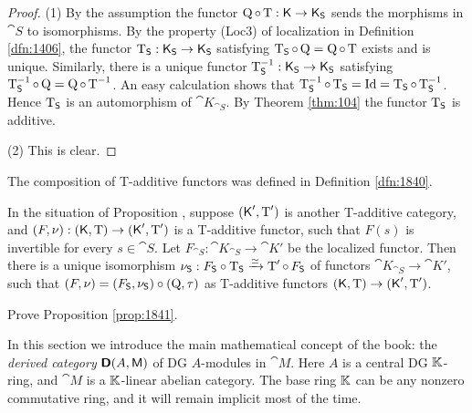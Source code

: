 \begin{proof} \mbox{}

\smallskip \noindent
(1) By the assumption the functor 
$\operatorname{Q} \circ \operatorname{T} : \operatorname{\mathsf{K}} \to  \operatorname{\mathsf{K}}_{\operatorname{\mathsf{S}}}$
sends the morphisms in $\cat{S}$ to isomorphisms. By the property (Loc3) of 
localization in Definition \ref{dfn:1406}, the functor 
$\operatorname{T}_{\operatorname{\mathsf{S}}} : \operatorname{\mathsf{K}}_{\operatorname{\mathsf{S}}} \to  \operatorname{\mathsf{K}}_{\operatorname{\mathsf{S}}}$ 
satisfying
$\operatorname{T}_{\operatorname{\mathsf{S}}} \circ \operatorname{Q} = \operatorname{Q} \circ \operatorname{T}$
exists and is unique. 
Similarly, there is a unique functor 
$\operatorname{T}^{-1}_{\operatorname{\mathsf{S}}} : \operatorname{\mathsf{K}}_{\operatorname{\mathsf{S}}} \to  \operatorname{\mathsf{K}}_{\operatorname{\mathsf{S}}}$ 
satisfying
$\operatorname{T}^{-1}_{\operatorname{\mathsf{S}}} \circ \operatorname{Q} = \operatorname{Q} \circ \operatorname{T}^{-1}$.
An easy calculation shows that 
$\operatorname{T}^{-1}_{\operatorname{\mathsf{S}}} \circ \operatorname{T}_{\operatorname{\mathsf{S}}} = \operatorname{Id} = 
\operatorname{T}_{\operatorname{\mathsf{S}}} \circ \operatorname{T}^{-1}_{\operatorname{\mathsf{S}}}$.
Hence $\operatorname{T}_{\operatorname{\mathsf{S}}}$ is an automorphism of $\cat{K}_{\cat{S}}$.
By Theorem \ref{thm:104} the functor $\operatorname{T}_{\operatorname{\mathsf{S}}}$ is additive. 

\medskip \noindent 
(2) This is clear. 
\end{proof}

The composition of T-additive functors was defined in Definition \ref{dfn:1840}.

\begin{prop} \label{prop:1841}
In the situation of Proposition \tup{\ref{prop:1840}}, suppose 
$(\operatorname{\mathsf{K}}', \operatorname{T}')$ is another  T-additive category, and 
$(F, \nu) :  (\operatorname{\mathsf{K}}, \operatorname{T}) \to (\operatorname{\mathsf{K}}', \operatorname{T}')$
is a T-additive functor, such that $F(s)$ is invertible for every 
$s \in \cat{S}$. Let 
$F_{\cat{S}} : \cat{K}_{\cat{S}} \to \cat{K}'$
be the localized functor. 
Then there is a unique isomorphism 
$\nu_{\operatorname{\mathsf{S}}} : F_{\operatorname{\mathsf{S}}} \circ \operatorname{T}_{\operatorname{\mathsf{S}}} \xrightarrow{\simeq}
\operatorname{T}' \circ \, F_{\operatorname{\mathsf{S}}}$
of functors $\cat{K}_{\cat{S}} \to  \cat{K}'$, such that
$(F, \nu) = (F_{\operatorname{\mathsf{S}}}, \nu_{\operatorname{\mathsf{S}}}) \circ (\operatorname{Q}, \tau)$ 
as T-additive functors 
$(\operatorname{\mathsf{K}}, \operatorname{T}) \to (\operatorname{\mathsf{K}}', \operatorname{T}')$.
\end{prop}

\begin{exer}  \label{exer:1840}
Prove Proposition \ref{prop:1841}. 
\end{exer}




\cleardoublepage
{} 
\label{sec:der-cat}

\AYcopyright

In this section we introduce the main mathematical concept of the book: the 
{\em derived category} $\boldsymbol{\mathsf{D}}(A, \operatorname{\mathsf{M}})$ of DG $A$-modules in $\cat{M}$. 
Here $A$ is a central DG $\mathbb{K}$-ring, and $\cat{M}$ is a $\mathbb{K}$-linear abelian 
category. The base ring $\mathbb{K}$ can be any nonzero commutative ring, and it will 
remain implicit most of the time. 


